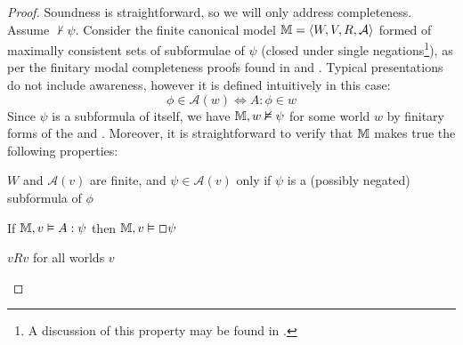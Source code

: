 \begin{proof}
  Soundness is straightforward, so we will only address completeness.  Assume
  $\nvdash \psi$.  Consider the finite canonical model $\mathbbm{M}= \langle
  W, V, R, \mathcal{A} \rangle$ formed of maximally consistent sets of
  subformulae of $\psi$ (closed under single negations{\footnote{A discussion
  of this property may be found in {\cite[pg.
  243]{blackburn_modal_2001}}.}}), as per the finitary modal completeness
  proofs found in {\cite[chapter 4.8]{blackburn_modal_2001}} and
  {\cite[chapter 5]{boolos_logic_1995}}.  Typical presentations do not
  include awareness, however it is defined intuitively in this case:
  \[ \phi \in \mathcal{A}(w) \Longleftrightarrow A : \phi \in w \]
  Since $\psi$ is a subformula of itself, we have $\mathbbm{M}, w \nvDash
  \psi$ for some world $w$ by finitary forms of the {} and
  {}.  Moreover, it is straightforward to verify that
  $\mathbbm{M}$ makes true the following properties:
  \begin{enumeratenumeric}
    \item\label{awareness0-prop1} $W$ and $\mathcal{A}(v)$ are finite, and $\psi \in \mathcal{A}(v)$
    only if $\psi$ is a (possibly negated) subformula of $\phi$
    \item \label{awareness0-prop2} If $\mathbbm{M}, v \vDash A : \psi$ then $\mathbbm{M}, v \vDash \Box
    \psi$ 
    \item \label{awareness0-prop3} $v R v$ for all worlds $v$
  \end{enumeratenumeric}
  
  
  
    

\end{proof}
